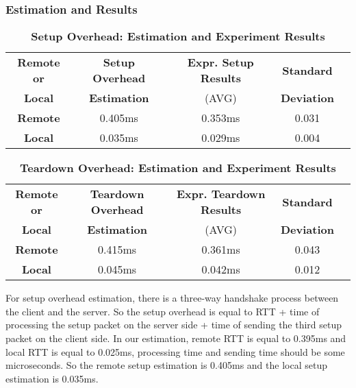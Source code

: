 \subsubsection{Estimation and Results}

\begin{table}[ht]
  \centering
  \caption{\textbf{Setup Overhead: Estimation and Experiment Results}}
  \begin{threeparttable}
  \begin{tabular}{ccccc}
  \hline
      \textbf{Remote or} & \textbf{Setup Overhead}  & \textbf{Expr. Setup Results} & \textbf{Standard} \\
      \textbf{Local}  & \textbf{Estimation}  & (AVG)   & \textbf{Deviation} \\
  \hline
      \textbf{Remote}  & 0.405ms & 0.353ms & 0.031 \\
      \textbf{Local} & 0.035ms & 0.029ms & 0.004 \\
  \hline
  \end{tabular}
  \end{threeparttable}
  \label{setup_overhead_table}
\end{table}

\begin{table}[ht]
  \centering
  \caption{\textbf{Teardown Overhead: Estimation and Experiment Results}}
  \begin{threeparttable}
  \begin{tabular}{ccccc}
  \hline
      \textbf{Remote or} & \textbf{Teardown Overhead}  & \textbf{Expr. Teardown Results} & \textbf{Standard} \\
      \textbf{Local}  & \textbf{Estimation}  & (AVG)   & \textbf{Deviation} \\
  \hline
      \textbf{Remote}  & 0.415ms & 0.361ms & 0.043 \\
      \textbf{Local} & 0.045ms & 0.042ms & 0.012 \\
  \hline
  \end{tabular}
  \end{threeparttable}
  \label{setup_table}
\end{table}

For setup overhead estimation, there is a three-way handshake process between the client and the server. So the setup overhead is equal to RTT + time of processing the setup packet on the server side + time of sending the third setup packet on the client side. In our estimation, remote RTT is equal to 0.395ms and local RTT is equal to 0.025ms, processing time and sending time should be some microseconds. So the remote setup estimation is 0.405ms and the local setup estimation is 0.035ms.


